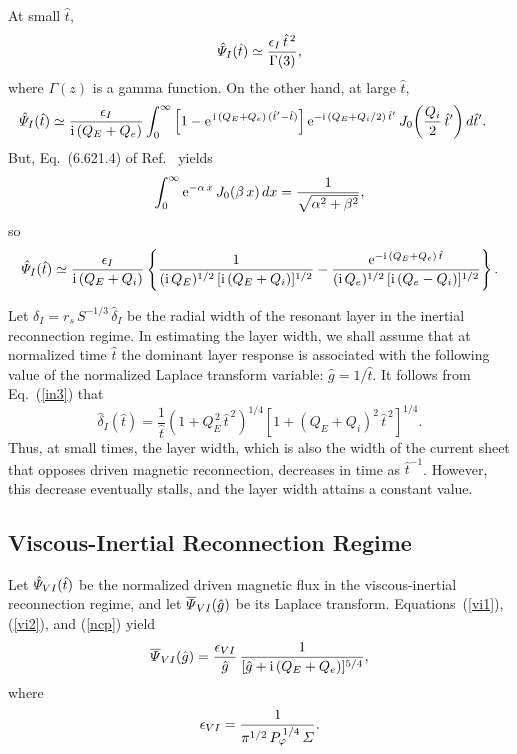 \documentclass[12pt,prb,aps]{revtex4-1}
\begin{document}
At small $\hat{t}$,
\begin{equation}\label{inertials}
\hat{\mit\Psi}_{I}(\hat{t})\simeq \frac{\epsilon_I\,\hat{t}^{\,2}}{\Gamma(3)},
\end{equation}
where $\Gamma(z)$ is a gamma function.
On the other hand, at large $\hat{t}$,
\begin{align}
\hat{\mit\Psi}_{I}(\hat{t}) &\simeq \frac{\epsilon_I}{{\rm i}\,(Q_E+Q_e)}
\int_0^{\infty}\left[1-{\rm e}^{\,{\rm i}\,(Q_E+Q_e)\,(\hat{t}'-\hat{t})}\right]
{\rm e}^{-{\rm i}\,(Q_E+Q_i/2)\,\hat{t}'}\,J_0\!\left(\frac{Q_i}{2}\,\hat{t}'\right)d\hat{t}'.
\end{align}
But, Eq.~(6.621.4) of Ref.~ yields
\begin{equation}
\int_0^\infty {\rm e}^{-\alpha\,x}\,J_0(\beta\,x)\,dx =\frac{1}{\sqrt{\alpha^2+\beta^2}},
\end{equation}
so
\begin{equation}\label{inertiall}
\hat{\mit\Psi}_{I}(\hat{t})\simeq \frac{\epsilon_I}{{\rm i}\,(Q_E+Q_i)}\left\{
\frac{1}{({\rm i}\,Q_E)^{1/2}\,[{\rm i}\,(Q_E+Q_i)]^{1/2}}- \frac{{\rm e}^{-{\rm i}\,(Q_E+Q_e)\,\hat{t}}}{({\rm i}\,Q_e)^{1/2}\,[{\rm i}\,(Q_e-Q_i)]^{1/2}}\right\}.
\end{equation}

Let $\delta_I =r_s\,S^{-1/3}\,\hat{\delta}_I $ be the radial width of the resonant layer in the inertial reconnection regime. 
In estimating the
layer width, we shall assume that at normalized time $\hat{t}$ the dominant layer response is associated with the following value of the normalized Laplace
transform variable: $\hat{g}=1/\hat{t}$. 
It follows from Eq.~(\ref{in3}) that 
\begin{equation}\label{deltaI}
\hat{\delta}_I(\hat{t})= \frac{1}{\hat{t}}\left(1+Q_E^{\,2}\,\hat{t}^{\,2}\right)^{1/4}\left[1+(Q_E+Q_i)^2\,\hat{t}^{\,2}\right]^{1/4}.
\end{equation}
Thus, at small times, the layer width, which is also the width of the current sheet that  opposes driven magnetic reconnection, decreases in time as $\hat{t}^{-1}$.\cite{hk} However, this decrease eventually stalls, and the
layer width attains a constant value. 

\subsection{Viscous-Inertial Reconnection Regime}
Let $\hat{\mit\Psi}_{VI}(\hat{t})$ be the normalized driven magnetic flux in the viscous-inertial reconnection regime, and let $\overline{\mit\Psi}_{VI}(\hat{g})$ be its Laplace transform.
Equations~(\ref{vi1}), (\ref{vi2}), and (\ref{ncp}) yield
\begin{align}
\overline{\mit\Psi}_{VI}(\hat{g}) =
\frac{ \epsilon_{VI}}{\hat{g}}\,\frac{1}{[\hat{g}+{\rm i}\,(Q_E+Q_e)]^{5/4}},
\end{align}
where
\begin{equation}
\epsilon_{VI} = \frac{1}{\pi^{1/2}\,P_\varphi^{\,1/4}\,{\mit\Sigma}}.
\end{equation}
\end{document}

